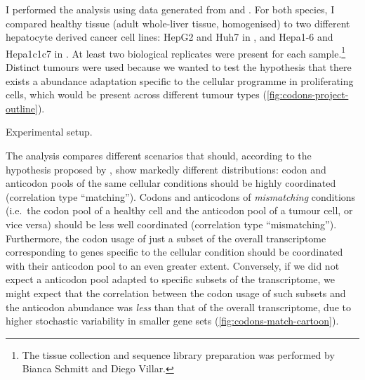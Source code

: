 I performed the analysis using data generated from \mmu and \hsa. For both
species, I compared healthy tissue (adult whole-liver tissue, homogenised) to
two different hepatocyte derived cancer cell lines: HepG2 and Huh7 in \hsa, and
Hepa1-6 and Hepa1c1c7 in \mmu. At least two biological replicates were present
for each sample.\footnote{The tissue collection and sequence library preparation
was performed by Bianca Schmitt and Diego Villar.} Distinct tumours were used
because we wanted to test the hypothesis that there exists a \trna abundance
adaptation specific to the cellular programme in proliferating cells, which
would be present across different tumour types
(\cref{fig:codons-project-outline}).

    {Experimental setup.}{}

The analysis compares different scenarios that should, according to the
hypothesis proposed by \citet{Gingold:2014}, show markedly different
distributions: codon and anticodon pools of the same cellular conditions should
be highly coordinated (correlation type “matching”). Codons and anticodons of
\emph{mismatching} conditions (i.e.\ the codon pool of a healthy cell and the
anticodon pool of a tumour cell, or vice versa) should be less well coordinated
(correlation type “mismatching”). Furthermore, the codon usage of just a subset
of the overall transcriptome corresponding to genes specific to the cellular
condition should be coordinated with their anticodon pool to an even greater
extent. Conversely, if we did not expect a \trna anticodon pool adapted to
specific subsets of the transcriptome, we might expect that the correlation
between the codon usage of such subsets and the anticodon abundance was
\emph{less} than that of the overall transcriptome, due to higher stochastic
variability in smaller gene sets (\cref{fig:codons-match-cartoon}).

